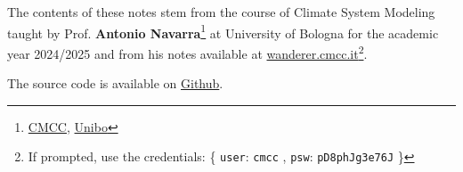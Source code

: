 \documentclass[
    11pt, 
    twoside, 
    english
]{book} %
\begin{document}

\newpage



\vspace*{\fill}
The contents of these notes stem from the course of Climate System Modeling taught by Prof. \textbf{Antonio Navarra}\footnote{\href{https://www.cmcc.it/people/navarra-a}{CMCC}, \href{https://www.unibo.it/sitoweb/antonio.navarra/en}{Unibo}} at University of Bologna for the academic year 2024/2025 and from his notes available at \href{https://wanderer.cmcc.it}{wanderer.cmcc.it}\footnote{
	If prompted, use the credentials: \{ \texttt{user}: \texttt{cmcc}  ,
	\texttt{psw}: \texttt{pD8phJg3e76J} \} }.

The source code is available on \href{https://github.com/niccolozanotti/climate-modeling/}{Github}.
\vspace*{\fill}

\tableofcontents
\newpage
















%
%
%
%
%
%
%
%
%
%
%
%
%
%
%
\end{document}
